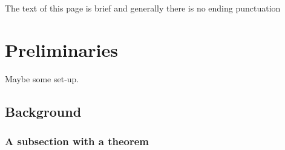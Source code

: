\documentclass[12pt]{report} %
\numberwithin{equation}{subsection}
\numberwithin{figure}{chapter} %
\theoremstyle{numbernote}
\theoremstyle{nonumber}
\theoremstyle{nonumbernonote}
\theoremstyle{nonote}
\begin{document}
\pagebreak

{\centering The text of this page is brief and generally there is no ending punctuation \par}

\pagebreak
\restoregeometry



\chapter{Preliminaries} \label{Chapter: Preliminaries}

Maybe some set-up.

\section{Background}

\subsection{A subsection with a theorem}
\end{document}
